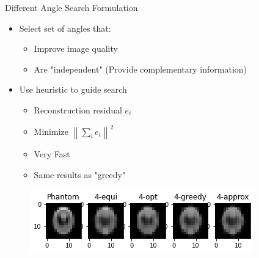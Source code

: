 \documentclass[english,aspectratio=43]{beamer}
\DeclareMathOperator*{\argmin}{arg\,min}
\newcommand{\norm}[1]{\left\lVert#1\right\rVert}
\begin{document}
            
            


\begin{frame}{Different Angle Search Formulation}
	\begin{itemize}
	    \setlength\itemsep{2em}
		    
		\item Select set of angles that:
	    \begin{itemize}
    		\item Improve image quality
    		\item Are "independent" (Provide complementary information)
            
    	\end{itemize}
        
        \item Use heuristic to guide search
        \begin{itemize}
    		\item Reconstruction residual $e_i$
    	    \item Minimize $\norm{\sum_i e_i}^2$
    	    \item Very Fast
    	    \item Same results as "greedy"
            
    	\end{itemize}
        
	\end{itemize}
	
	\begin{figure}
    \includegraphics[scale=0.9]{Figs/plot_recon_compare3.png}
    \end{figure}
\end{frame}




\end{document}
